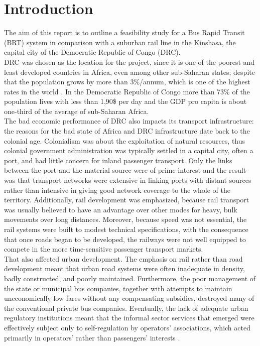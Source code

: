 \documentclass{article}
\begin{document}
\section{Introduction}
The aim of this report is to outline a feasibility study for a Bus Rapid Transit (BRT) system in comparison with a suburban rail line in the Kinshasa, the capital city of the Democratic Republic of Congo (DRC).\\
DRC was chosen as the location for the project, since it is one of the poorest and least developed countries in Africa, even among other sub-Saharan states; despite that the population grows by more than 3\%/annum, which is one of the highest rates in the world \cite{worldbank0}. In the Democratic Republic of Congo more than 73\% of the population lives with less than 1,90\$ per day and the GDP pro capita is about one-third of the average of sub-Saharan Africa.\\
The bad economic performance of DRC also impacts its transport infrastructure: the reasons for the bad state of Africa and DRC infrastructure date back to the colonial age. Colonialism was about the exploitation of natural resources, thus colonial government administration was typically settled in a capital city, often a port, and had little concern for inland passenger transport. Only the links between the port and the material source were of prime interest and the result was that transport networks were extensive in linking ports with distant sources rather than intensive in giving good network coverage to the whole of the territory. Additionally, rail development was emphasized, because rail transport was usually believed to have an advantage over other modes for heavy, bulk movements over long distances. Moreover, because speed was not essential, the rail systems were built to modest technical specifications, with the consequence that once roads began to be developed, the railways were not well equipped to compete in the more time-sensitive passenger transport markets.\\
That also affected urban development. The emphasis on rail rather than road development meant that urban road systems were often inadequate in density, badly constructed, and poorly maintained. Furthermore, the poor management of the state or municipal bus companies, together with attempts to maintain uneconomically low fares without any compensating subsidies, destroyed many of the conventional private bus companies. Eventually, the lack of adequate urban regulatory institutions meant that the informal sector services that emerged were effectively subject only to self-regulation by operators’ associations, which acted primarily in operators’ rather than passengers’ interests \cite{africatransport}.\\
\end{document}
